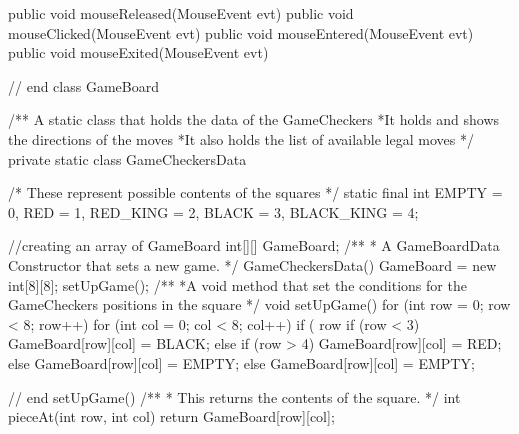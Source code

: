 \documentclass[10pt, a4paper]{article}
\begin{document}
{{      public void mouseReleased(MouseEvent evt) { }
      public void mouseClicked(MouseEvent evt) { }
      public void mouseEntered(MouseEvent evt) { }
      public void mouseExited(MouseEvent evt) { }

   }  // end class GameBoard

   /**
   A static class that holds the data of the GameCheckers
   *It holds and shows the directions of the moves
   *It also holds the list of available legal moves
    */
   private static class GameCheckersData {
      /*  These represent possible contents of the squares */
      static final int
                EMPTY = 0,
                RED = 1,
                RED_KING = 2,
                BLACK = 3,
                BLACK_KING = 4;

      //creating an array of GameBoard
      int[][] GameBoard;
      /**
       * A GameBoardData Constructor that sets a new game.
       */
      GameCheckersData() {
         GameBoard = new int[8][8];
         setUpGame();
      }
      /**
	   *A void method that set the conditions for the GameCheckers positions in the square
       */
      void setUpGame() {
         for (int row = 0; row < 8; row++) {
            for (int col = 0; col < 8; col++) {
               if ( row %
                  if (row < 3)
                     GameBoard[row][col] = BLACK;
                  else if (row > 4)
                     GameBoard[row][col] = RED;
                  else
                     GameBoard[row][col] = EMPTY;
               }
               else {
                  GameBoard[row][col] = EMPTY;
               }
            }
         }
      }  // end setUpGame()
      /**
       * This returns the contents of the square.
       */
      int pieceAt(int row, int col) {
         return GameBoard[row][col];
      }

}
\end{document}
